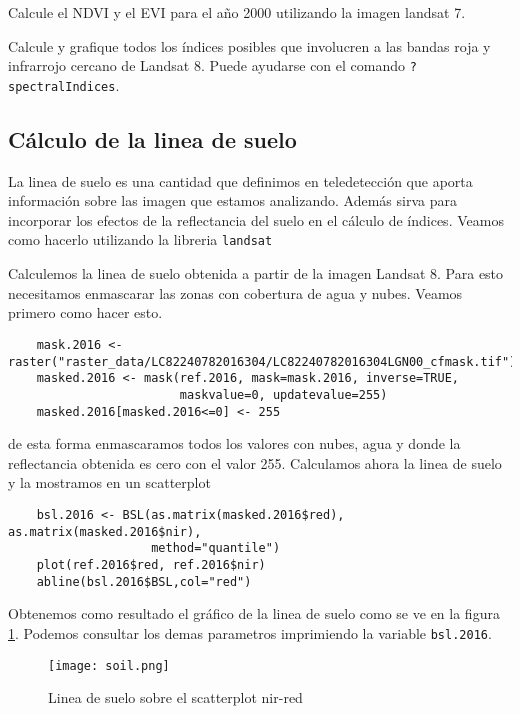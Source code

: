 \begin{act}
    Calcule el NDVI y el EVI para el año 2000 utilizando la imagen landsat 7.
\end{act}

\begin{act}
    Calcule y grafique todos los \'indices posibles que involucren a las bandas
    roja y infrarrojo cercano de Landsat 8. Puede ayudarse con el comando
    \texttt{?spectralIndices}.
\end{act}

\subsection{C\'alculo de la linea de suelo}

La linea de suelo es una cantidad que definimos en teledetecci\'on que aporta
informaci\'on sobre las imagen que estamos analizando. Adem\'as sirva para incorporar
los efectos de la reflectancia del suelo en el c\'alculo de \'indices.
Veamos como hacerlo utilizando la libreria
\texttt{landsat}

\begin{exa}
    Calculemos la linea de suelo obtenida a partir de la imagen Landsat 8.
    Para esto necesitamos enmascarar las zonas con
    cobertura de agua y nubes. Veamos primero como hacer esto.
    \begin{lstlisting}
    mask.2016 <- raster("raster_data/LC82240782016304/LC82240782016304LGN00_cfmask.tif")
    masked.2016 <- mask(ref.2016, mask=mask.2016, inverse=TRUE,
                        maskvalue=0, updatevalue=255)
    masked.2016[masked.2016<=0] <- 255
    \end{lstlisting}
    de esta forma enmascaramos todos los valores con nubes, agua y donde la
    reflectancia obtenida es cero con el valor 255.
    Calculamos ahora la linea de suelo y la mostramos en un scatterplot
    \begin{lstlisting}
    bsl.2016 <- BSL(as.matrix(masked.2016$red), as.matrix(masked.2016$nir),
                    method="quantile")
    plot(ref.2016$red, ref.2016$nir)
    abline(bsl.2016$BSL,col="red")
    \end{lstlisting}
    Obtenemos como resultado el gr\'afico de la linea de suelo como se ve en la
    figura \ref{fig:soil}. Podemos consultar
    los demas parametros imprimiendo la variable \texttt{bsl.2016}.
    \begin{figure}[h!]
    \begin{center}
        \texttt{[image: soil.png]}
    \end{center}
    \caption{Linea de suelo sobre el scatterplot nir-red}
    \label{fig:soil}
    \end{figure}

\end{exa}

